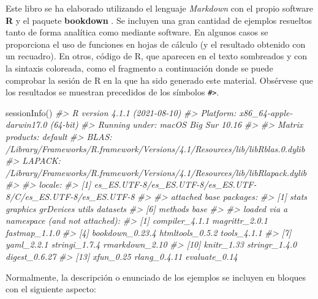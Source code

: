 \documentclass[
]{book}
\newenvironment{Shaded}{\begin{snugshade}}{\end{snugshade}}
\newcommand{\CommentTok}[1]{\textcolor[rgb]{0.56,0.35,0.01}{\textit{#1}}}
\newcommand{\FunctionTok}[1]{\textcolor[rgb]{0.00,0.00,0.00}{#1}}
\newcommand{\NormalTok}[1]{#1}
\theoremstyle{definition}
\theoremstyle{definition}
\theoremstyle{definition}
\theoremstyle{definition}
\theoremstyle{remark}
\begin{document}
Este libro se ha elaborado utilizando el lenguaje \emph{Markdown} con el propio
software \textbf{R} y el paquete \textbf{bookdown} \citep{R-bookdown}.
Se incluyen una gran cantidad de ejemplos resueltos tanto de forma analítica
como mediante software. En algunos casos se proporciona el uso de funciones
en hojas de cálculo (y el resultado obtenido con un recuadro).
En otros, código de R, que aparecen en el texto
sombreados y con la sintaxis coloreada, como el fragmento a continuación
donde se puede comprobar la sesión de R en la que ha sido generado este material.
Obsérvese que los resultados se muestran precedidos de los símbolos
\texttt{\#\textgreater{}}.

\begin{Shaded}
\begin{Highlighting}[]
\FunctionTok{sessionInfo}\NormalTok{()}
\CommentTok{\#\textgreater{} R version 4.1.1 (2021{-}08{-}10)}
\CommentTok{\#\textgreater{} Platform: x86\_64{-}apple{-}darwin17.0 (64{-}bit)}
\CommentTok{\#\textgreater{} Running under: macOS Big Sur 10.16}
\CommentTok{\#\textgreater{} }
\CommentTok{\#\textgreater{} Matrix products: default}
\CommentTok{\#\textgreater{} BLAS:   /Library/Frameworks/R.framework/Versions/4.1/Resources/lib/libRblas.0.dylib}
\CommentTok{\#\textgreater{} LAPACK: /Library/Frameworks/R.framework/Versions/4.1/Resources/lib/libRlapack.dylib}
\CommentTok{\#\textgreater{} }
\CommentTok{\#\textgreater{} locale:}
\CommentTok{\#\textgreater{} [1] es\_ES.UTF{-}8/es\_ES.UTF{-}8/es\_ES.UTF{-}8/C/es\_ES.UTF{-}8/es\_ES.UTF{-}8}
\CommentTok{\#\textgreater{} }
\CommentTok{\#\textgreater{} attached base packages:}
\CommentTok{\#\textgreater{} [1] stats     graphics  grDevices utils     datasets }
\CommentTok{\#\textgreater{} [6] methods   base     }
\CommentTok{\#\textgreater{} }
\CommentTok{\#\textgreater{} loaded via a namespace (and not attached):}
\CommentTok{\#\textgreater{}  [1] compiler\_4.1.1  magrittr\_2.0.1  fastmap\_1.1.0  }
\CommentTok{\#\textgreater{}  [4] bookdown\_0.23.4 htmltools\_0.5.2 tools\_4.1.1    }
\CommentTok{\#\textgreater{}  [7] yaml\_2.2.1      stringi\_1.7.4   rmarkdown\_2.10 }
\CommentTok{\#\textgreater{} [10] knitr\_1.33      stringr\_1.4.0   digest\_0.6.27  }
\CommentTok{\#\textgreater{} [13] xfun\_0.25       rlang\_0.4.11    evaluate\_0.14}
\end{Highlighting}
\end{Shaded}

Normalmente, la descripción o enunciado de los ejemplos se incluyen en bloques
con el siguiente aspecto:
\end{document}
